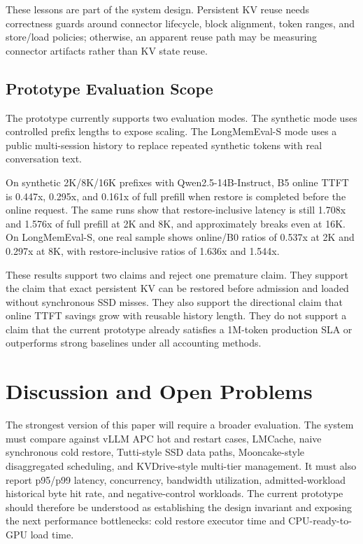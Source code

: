 \documentclass[sigconf,review,anonymous]{acmart}
\begin{document}
These lessons are part of the system design. Persistent KV reuse needs
correctness guards around connector lifecycle, block alignment, token ranges,
and store/load policies; otherwise, an apparent reuse path may be measuring
connector artifacts rather than KV state reuse.

\subsection{Prototype Evaluation Scope}

The prototype currently supports two evaluation modes. The synthetic mode uses
controlled prefix lengths to expose scaling. The LongMemEval-S mode uses a
public multi-session history to replace repeated synthetic tokens with real
conversation text.

On synthetic 2K/8K/16K prefixes with Qwen2.5-14B-Instruct, B5 online TTFT is
0.447x, 0.295x, and 0.161x of full prefill when restore is completed before
the online request. The same runs show that restore-inclusive latency is still
1.708x and 1.576x of full prefill at 2K and 8K, and approximately breaks even
at 16K. On LongMemEval-S, one real sample shows online/B0 ratios of 0.537x at
2K and 0.297x at 8K, with restore-inclusive ratios of 1.636x and 1.544x.

These results support two claims and reject one premature claim. They support
the claim that exact persistent KV can be restored before admission and loaded
without synchronous SSD misses. They also support the directional claim that
online TTFT savings grow with reusable history length. They do not support a
claim that the current prototype already satisfies a 1M-token production SLA or
outperforms strong baselines under all accounting methods.

\section{Discussion and Open Problems}

The strongest version of this paper will require a broader evaluation. The
system must compare against vLLM APC hot and restart cases, LMCache, naive
synchronous cold restore, Tutti-style SSD data paths, Mooncake-style
disaggregated scheduling, and KVDrive-style multi-tier management. It must also
report p95/p99 latency, concurrency, bandwidth utilization, admitted-workload
historical byte hit rate, and negative-control workloads. The current prototype
should therefore be understood as establishing the design invariant and exposing
the next performance bottlenecks: cold restore executor time and
CPU-ready-to-GPU load time.
\end{document}

